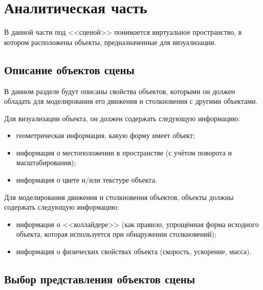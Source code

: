 \section{Аналитическая часть}





В данной части под <<сценой>> понимается виртуальное пространство, в котором расположены объекты, предназначенные для визуализации.

\subsection{Описание объектов сцены}

В данном разделе будут описаны свойства объектов, которыми он должен обладать для моделирования его движения и столкновения с другими объектами.

Для визуализации объекта, он должен содержать следующую информацию:
\begin{itemize}
    \item геометрическая информация, какую форму имеет объект;
    \item информация о местоположении в пространстве (с учётом поворота и масштабирования);
    \item информация о цвете и/или текстуре объекта.
\end{itemize}

Для моделирования движения и столкновения объектов, объекты должны содержать следующую информацию:
\begin{itemize}
    \item информация о <<коллайдере>> (как правило, упрощённая форма исходного объекта, которая используется при обнаружении столкновений);
    \item информация о физических свойствах объекта (скорость, ускорение, масса).
\end{itemize}

\subsection{Выбор представления объектов сцены}

